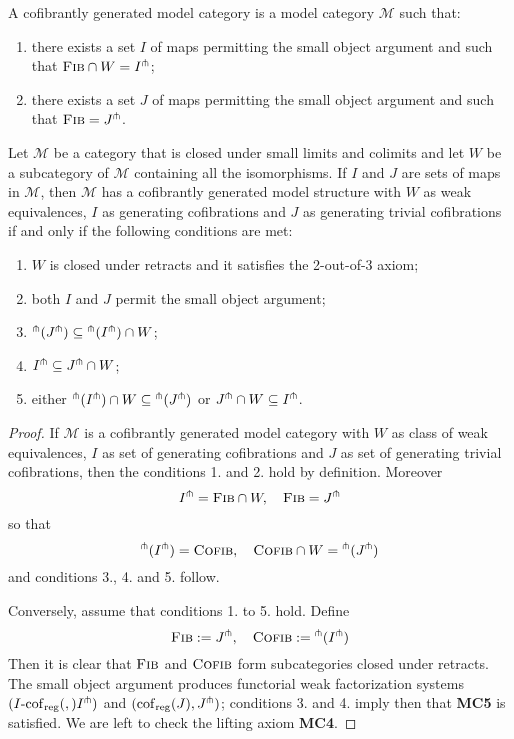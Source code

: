 \begin{refsection}
\begin{defin}
A cofibrantly generated model category is a model category $\mathcal M$ such that:
\begin{enumerate}
\item there exists a set $I$ of maps permitting the small object argument and such that $\textsc{Fib} \cap W = I^{\pitchfork}$;
\item there exists a set $J$ of maps permitting the small object argument and such that $\textsc{Fib} = J^{\pitchfork}$.
\end{enumerate}
\end{defin}

\begin{thm} \label{thm recognizing}
Let $\mathcal M$ be a category that is closed under small limits and colimits and let $W$ be a subcategory of $\mathcal M$ containing all the isomorphisms. If $I$ and $J$ are sets of maps in $\mathcal M$, then $\mathcal M$ has a cofibrantly generated model structure with $W$ as weak equivalences, $I$ as generating cofibrations and $J$ as generating trivial cofibrations if and only if the following conditions are met:
\begin{enumerate}
\item $W$ is closed under retracts and it satisfies the 2-out-of-3 axiom;
\item both $I$ and $J$ permit the small object argument;
\item ${}^{\pitchfork}(J^{\pitchfork}) \subseteq {}^{\pitchfork}(I^{\pitchfork}) \cap W$;
\item $I^{\pitchfork} \subseteq J^{\pitchfork} \cap W$;
\item either ${}^{\pitchfork}(I^{\pitchfork}) \cap W \subseteq {}^{\pitchfork}(J^{\pitchfork})$ or $J^{\pitchfork} \cap W \subseteq I^{\pitchfork}$.
\end{enumerate}
\end{thm}

\begin{proof}
If $\mathcal M$ is a cofibrantly generated model category with $W$ as class of weak equivalences, $I$ as set of generating cofibrations and $J$ as set of generating trivial cofibrations, then the conditions 1. and 2. hold by definition. Moreover
\[
I^{\pitchfork} = \textsc{Fib} \cap W, \quad \textsc{Fib} = J^{\pitchfork}
\]
so that
\[
{}^{\pitchfork}(I^{\pitchfork}) = \textsc{Cofib}, \quad \textsc{Cofib} \cap W = {}^{\pitchfork}(J^{\pitchfork})
\]
and conditions 3., 4. and 5. follow.

Conversely, assume that conditions 1. to 5. hold. Define
\[
\textsc{Fib} := J^{\pitchfork}, \quad \textsc{Cofib} := {}^{\pitchfork}(I^{\pitchfork})
\]
Then it is clear that $\textsc{Fib}$ and $\textsc{Cofib}$ form subcategories closed under retracts. The small object argument produces functorial weak factorization systems $(I \textrm{-} \mathrm{cof}_{\mathrm{reg}}(,) I^{\pitchfork})$ and $(\mathrm{cof}_{\mathrm{reg}}(J), J^{\pitchfork})$; conditions 3. and 4. imply then that {\bfseries MC5} is satisfied. We are left to check the lifting axiom {\bfseries MC4}.


\end{proof}
\end{refsection}
